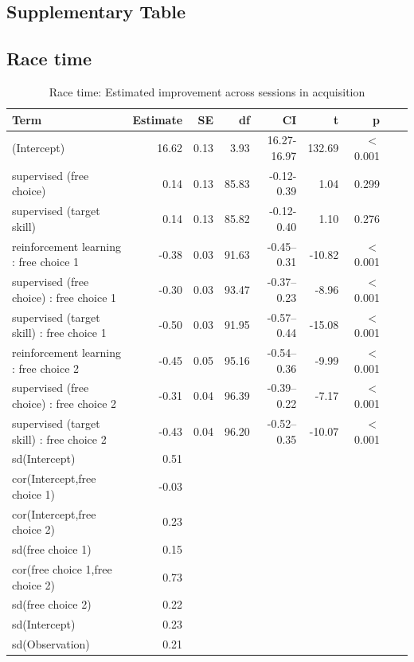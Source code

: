 \documentclass[pdflatex,sn-mathphys-num]{sn-jnl}%
\theoremstyle{thmstyleone}%
\theoremstyle{thmstyletwo}%
\theoremstyle{thmstylethree}%
\begin{document}
\begin{appendices}
\section{Supplementary Table}

\subsection{Race time}

\begin{table}[h!]
\caption{Race time: Estimated improvement across sessions in acquisition}\label{table_racetime_acquisition_change}
\centering
\begin{tabular}{lrrrrrrrr}
  \hline
 Term & Estimate & SE & df & CI & t & p \\ 
  \hline
 (Intercept) & 16.62 & 0.13 & 3.93 & 16.27-16.97 & 132.69 &  $<$  0.001 \\ 
   supervised (free choice) & 0.14 & 0.13 & 85.83 & -0.12-0.39 & 1.04 &    0.299 \\ 
   supervised (target skill) & 0.14 & 0.13 & 85.82 & -0.12-0.40 & 1.10 &    0.276 \\ 
  reinforcement learning : free choice 1 & -0.38 & 0.03 & 91.63 & -0.45--0.31 & -10.82 &  $<$  0.001 \\ 
   supervised (free choice) : free choice 1 & -0.30 & 0.03 & 93.47 & -0.37--0.23 & -8.96 &  $<$  0.001 \\ 
   supervised (target skill) : free choice 1 & -0.50 & 0.03 & 91.95 & -0.57--0.44 & -15.08 &  $<$  0.001 \\ 
   reinforcement learning : free choice 2 & -0.45 & 0.05 & 95.16 & -0.54--0.36 & -9.99 &  $<$  0.001 \\ 
   supervised (free choice) : free choice 2 & -0.31 & 0.04 & 96.39 & -0.39--0.22 & -7.17 &  $<$  0.001 \\ 
   supervised (target skill) : free choice 2 & -0.43 & 0.04 & 96.20 & -0.52--0.35 & -10.07 &  $<$  0.001 \\ 
   sd(Intercept) & 0.51 &  &  &  &  &  &  \\ 
   cor(Intercept,free choice 1) & -0.03 &  &  &  &  &  &  \\ 
   cor(Intercept,free choice 2) & 0.23 &  &  &  &  &  &  \\ 
   sd(free choice 1) & 0.15 &  &  &  &  &  &  \\ 
   cor(free choice 1,free choice 2) & 0.73 &  &  &  &  &  &  \\ 
  sd(free choice 2) & 0.22 &  &  &  &  &  &  \\ 
   sd(Intercept) & 0.23 &  &  &  &  &  &  \\ 
   sd(Observation) & 0.21 &  &  &  &  &  &  \\ 
   \hline
\end{tabular}
\end{table}



\end{appendices}
\end{document}

